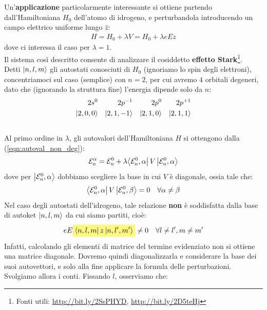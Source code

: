 \documentclass[../../FisicaTeorica.tex]{subfiles}
\begin{document}
Un'\textbf{applicazione} particolarmente interessante si ottiene partendo dall'Hamiltoniana $H_0$ dell'atomo di idrogeno, e perturbandola introducendo un campo elettrico uniforme lungo $\hat{z}$:
\begin{align*}
H = H_0 + \lambda V = H_0 + \lambda eEz
\end{align*}
dove ci interessa il caso per $\lambda = 1$.\\
Il sistema così descritto consente di analizzare il cosiddetto \textbf{effetto Stark}\footnote{Fonti utili: \url{http://bit.ly/2SsPHYD}, \url{http://bit.ly/2D5teHj}}.\\

Detti $\Ket{n,l,m}$ gli autostati conosciuti di $H_0$ (ignoriamo lo spin degli elettroni), concentriamoci sul caso (semplice) con $n=2$, per cui avremo $4$ orbitali degeneri, dato che (ignorando la struttura fine) l'energia dipende solo da $n$:
\begin{align*}
2s^0 && 2p^{-1} && 2p^0 && 2p^{+1}\\
\Ket{2,0,0} && \Ket{2,1,-1} && \Ket{2,1,0} && \Ket{2,1,1}
\end{align*}\\
Al primo ordine in $\lambda$, gli autovalori dell'Hamiltoniana $H$ si ottengono dalla (\ref{eqn:autoval_non_deg}):
\begin{align}
\mathcal{E}_n^\alpha = \mathcal{E}_n^0 + \lambda {\Bra{\mathcal{E}_n^0, \alpha}V \Ket{\mathcal{E}_n^0, \alpha}}
\label{eqn:autoval_primo_ordine}
\end{align}
dove per $\Ket{\mathcal{E}_n^0,\alpha}$ dobbiamo scegliere la base in cui $V$ è diagonale, ossia tale che:
\begin{align*}
\Bra{\mathcal{E}_n^0, \alpha}V\Ket{\mathcal{E}_n^0,\beta} = 0 \quad \forall \alpha \neq \beta
\end{align*}
Nel caso degli autostati dell'idrogeno, tale relazione \textbf{non} è soddisfatta dalla base di autoket $\Ket{n,l,m}$ da cui siamo partiti, cioè:
\begin{align*}
eE\hlc{Yellow}{\bra{n,l,m}z\ket{n,l',m'}} \neq 0 \quad \forall l\neq l', m\neq m'
\end{align*}
Infatti, calcolando gli elementi di matrice del termine evidenziato non si ottiene una matrice diagonale. Dovremo quindi diagonalizzarla e considerare la base dei suoi autovettori, e solo alla fine applicare la formula delle perturbazioni.\\
Svolgiamo allora i conti. Fissando $l$, osserviamo che:
\end{document}
